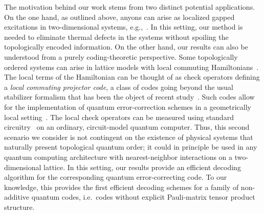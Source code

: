 \documentclass[aps, prl, letterpaper, twocolumn, superscriptaddress, notitlepage]{revtex4-1}
\begin{document}
The motivation behind our work stems from two distinct potential applications. On the one hand, as outlined above, anyons can arise as localized gapped excitations in two-dimensional systems, e.g.,~\cite{Moore1991, Nayak1996}. In this setting, our method is needed to eliminate thermal defects in the systems without spoiling the topologically encoded information. On the other hand, our results can also be understood from a purely coding-theoretic perspective. Some topologically ordered systems can arise in lattice models with local commuting Hamiltonians~\cite{Kitaev2003, Levin2005a, Koenig2010b}. The local terms of the Hamiltonian can be thought of as check operators defining a \emph{local commuting projector code}, a class of codes going beyond the usual stabilizer formalism that has been the object of recent study~\cite{Bravyi2009, Bravyi2010a, Haah2012a, Landon-Cardinal2012a}. Such codes allow for the implementation of quantum error-correction schemes in a geometrically local setting~\cite{Kitaev2003, Dennis2002}. The local check operators can be measured using standard circuitry~\cite{Bonesteel2012} on an ordinary, circuit-model quantum computer. Thus, this second scenario we consider is not contingent on the existence of physical systems that naturally present topological quantum order; it could in principle be used in any quantum computing architecture with nearest-neighbor interactions on a two-dimensional lattice. In this setting, our results provide an efficient decoding algorithm for the corresponding quantum error-correcting code. To our knowledge, this provides the first efficient decoding schemes for a family of non-additive quantum codes, i.e.\ codes without explicit Pauli-matrix tensor product structure. 
\end{document}
